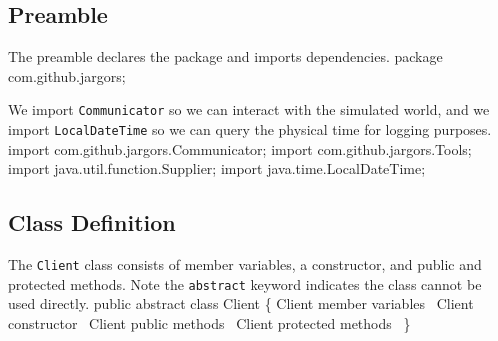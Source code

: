 \documentclass{article}
\def\nwendcode{\endtrivlist \endgroup}      %
\let\nwdocspar=\par
\begin{document}
\subsection{Preamble}
The preamble declares the package and imports dependencies.
\nwenddocs{}\endmoddef{}
package com.github.jargors;
\nwendcode{}\nwdocspar
We import {\tt{}Communicator} so we can interact with the simulated world,
and we import {\tt{}LocalDateTime} so we can query the physical time for
logging purposes.
\nwenddocs{}\plusendmoddef
import com.github.jargors.Communicator;
import com.github.jargors.Tools;
import java.util.function.Supplier;
import java.time.LocalDateTime;
\nwendcode{}\nwdocspar

\subsection{Class Definition}
The {\tt{}Client} class consists of member variables, a constructor, and
public and protected methods. Note the {\tt{}abstract} keyword indicates the class
cannot be used directly.
\nwenddocs{}\endmoddef{}
public abstract class Client \{
  \LA{}\code{}Client\edoc{} member variables~{\nwtagstyle{}}\RA{}
  \LA{}\code{}Client\edoc{} constructor~{\nwtagstyle{}}\RA{}
  \LA{}\code{}Client\edoc{} public methods~{\nwtagstyle{}}\RA{}
  \LA{}\code{}Client\edoc{} protected methods~{\nwtagstyle{}}\RA{}
\}
\nwendcode{}\nwdocspar
\end{document}
